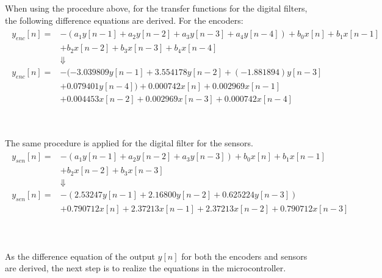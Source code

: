 When using the procedure above, for the transfer functions for the digital filters,  the following difference equations are derived. For the encoders:
\begin{align}
\begin{split}
y_{enc}[n] 	=& -(a_1y[n-1] + a_2y[n-2] + a_3y[n-3] + a_4y[n-4]) + b_0x[n] + b_1x[n-1]\\
			&  + b_2x[n-2] + b_3x[n-3] + b_4x[n-4] \\
			&\Downarrow \\
y_{enc}[n] 	=& -(-3.039809y[n-1] + 3.554178y[n-2] + (-1.881894)y[n-3]  \\ 
			&  + 0.079401y[n-4]) + 0.000742x[n] + 0.002969x[n-1] \\
			&  + 0.004453x[n-2] + 0.002969x[n-3] + 0.000742x[n-4]
\end{split}
\label{enc_diff}
\end{align}
\begin{where}
\\
\end{where}
The same procedure is applied for the digital filter for the sensors.
\begin{align}
\begin{split}
y_{sen}[n] 	=& -(a_1y[n-1] + a_2y[n-2] + a_3y[n-3]) + b_0x[n] + b_1x[n-1]\\
			&  + b_2x[n-2] + b_3x[n-3] \\
			&\Downarrow \\
y_{sen}[n] 	=& -(2.53247y[n-1] + 2.16800y[n-2] + 0.625224y[n-3])  \\ 
			&  + 0.790712x[n] + 2.37213x[n-1] + 2.37213x[n-2] + 0.790712x[n-3] \\
\end{split}
\label{sen_diff}
\end{align}
\begin{where}
\\
\end{where}

As the difference equation of the output $y[n]$ for both the encoders and sensors are derived, the next step is to realize the equations in the microcontroller.
